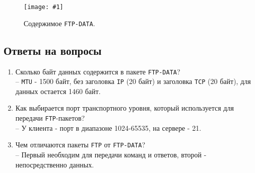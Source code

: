 \documentclass[12pt, a4paper]{article}
\newcommand{\figc}[4]{
  \begin{figure}[H]
  \begin{center}
    \texttt{[image: \#1]}
    \caption{#2}
    \label{fig:#3}
  \end{center}
  \end{figure}
}
\begin{document}
\figc{ftp_data}{Содержимое \texttt{FTP-DATA}.}{f_dt}{2.5}

\subsection{Ответы на вопросы}

\begin{enumerate}
  \item Сколько байт данных содержится в пакете \texttt{FTP-DATA}?\\
    -- \texttt{MTU} - 1500 байт, без заголовка \texttt{IP} (20 байт) и
    заголовка \texttt{TCP} (20 байт), для данных остается 1460 байт.
  \item Как выбирается порт транспортного уровня, который используется для
    передачи \texttt{FTP}-пакетов?\\
    -- У клиента - порт в диапазоне 1024-65535, на сервере - 21.
  \item Чем отличаются пакеты \texttt{FTP} от \texttt{FTP-DATA}?\\
    -- Первый необходим для передачи команд и ответов, второй - непосредственно
    данных.
\end{enumerate}
\end{document}
